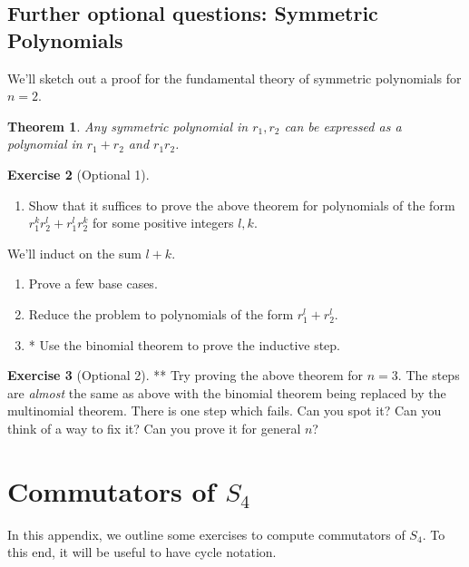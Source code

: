 \documentclass[reqno, 12pt, letter]{article}
\theoremstyle{plain}
\newtheorem{theorem}{Theorem}[section]
\theoremstyle{definition}
\newtheorem{exercise}[theorem]{Exercise}
\theoremstyle{remark}
\numberwithin{equation}{section}
\begin{document}
\subsection{Further optional questions: Symmetric Polynomials}
We'll sketch out a proof for the fundamental theory of symmetric polynomials for $ n=2$.
\begin{theorem}
	\label{theorem:fundamental_theorem_symmetric_polynomials}
	Any symmetric polynomial in $ r_1, r_2$ can be expressed as a polynomial in $ r_1 + r_2$ and $r_1 r_2$.
\end{theorem}
\begin{exercise}[Optional 1]
	\begin{enumerate}
		\item Show that it suffices to prove the above theorem for polynomials of the form $ r_1^k r_2^l + r_1^l r_2^k$ for some positive integers $l,k$.
	\end{enumerate}
	We'll induct on the sum $ l+k$.
	\begin{enumerate}[resume]
		\item Prove a few base cases.
		\item Reduce the problem to polynomials of the form $ r_1^l + r_2^l$.
		\item* Use the binomial theorem to prove the inductive step.
	\end{enumerate}
\end{exercise}

\begin{exercise}[Optional 2] **
	Try proving the above theorem for $ n=3$. The steps are \emph{almost} the same as above with the binomial theorem being replaced by the multinomial theorem. There is one step which fails. Can you spot it? Can you think of a way to fix it? Can you prove it for general $n$?
\end{exercise}
\fi


\newpage
\appendix
\section{Commutators of $S_4$}
\label{appendix:commutators-s4}
In this appendix, we outline some exercises to compute commutators of $S_4$.
To this end, it will be useful to have cycle notation.
\end{document}
